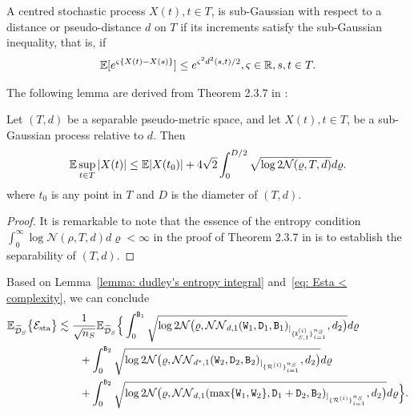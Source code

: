     \begin{definition}
        A centred stochastic process $X(t), t \in T$, is sub-Gaussian with respect to a distance or pseudo-distance $d$ on $T$ if its increments satisfy the sub-Gaussian inequality, that is, if
        \begin{align*}
            \mathbb{E}[e^{\varsigma\{X(t) - X(s)\}}] \leq e^{\varsigma^2d^2(s,t)/2}, \varsigma \in \mathbb{R}, s,t \in T.
        \end{align*}
    \end{definition}

    The following lemma are derived from Theorem 2.3.7 in \citet{gine2016mathematical}:
    \begin{lemma}\label{lemma: dudley's entropy integral}
        Let $(T,d)$ be a separable pseudo-metric space, and let $X(t), t \in T$, be a sub-Gaussian process relative to $d$. Then
        \begin{align*}
            \mathbb{E}\sup_{t \in T}\vert{X(t)}\vert \leq \mathbb{E}\vert{X(t_0)}\vert + 4\sqrt{2}\int_0^{D/2}\sqrt{\log 2\mathcal{N}(\varrho, T, d)}d\varrho.
        \end{align*}
        where $t_0$ is any point in $T$ and $D$ is the diameter of $(T,d)$.
    \end{lemma}
    \begin{proof}
        It is remarkable to note that the essence of the entropy condition $\int_0^\infty \log\mathcal{N}(\rho, T, d)d\varrho < \infty$ in the proof of Theorem 2.3.7 in \citet{gine2016mathematical} is to establish the separability of $(T,d)$.
    \end{proof}
    Based on Lemma~\ref{lemma: dudley's entropy integral} and~\eqref{eq: Esta < complexity}, we can conclude
    \begin{align}\label{eq: Esta < entropy}
        \mathbb{E}_{\widetilde{\mathcal{D}}_S}\big\{\mathcal{E}_{\mathrm{sta}}\big\} &\lesssim \frac{1}{\sqrt{n_S}}\mathbb{E}_{\widetilde{\mathcal{D}}_S}\Big\{\int_0^{\mathtt{B}_1}\sqrt{\log2\mathcal{N}\big(\varrho, \mathcal{NN}_{d,1}(\mathtt{W}_1, \mathtt{D}_1, \mathtt{B}_1)_{\vert_{\{\mathtt{X}^{(i)}_{S,1}\}_{i=1}^{n_S}}}, d_2\big)}d\varrho \nonumber\\
        &\qquad+ \int_0^{\mathtt{B}_2}\sqrt{\log2\mathcal{N}\big(\varrho, \mathcal{NN}_{d^*,1}(\mathtt{W}_2, \mathtt{D}_2, \mathtt{B}_2)_{\vert_{\{\mathcal{R}^{(i)}\}_{i=1}^{n_S}}}, d_2\big)}d\varrho \nonumber\\
        &\qquad+ \int_0^{\mathtt{B}_2}\sqrt{\log2\mathcal{N}\big(\varrho, \mathcal{NN}_{d,1}(\max\{\mathtt{W}_1, \mathtt{W}_2\}, \mathtt{D}_1 + \mathtt{D}_2, \mathtt{B}_2)_{\vert_{\{\mathcal{R}^{(i)}\}_{i=1}^{n_S}}}, d_2\big)}d\varrho
        \Big\}.
    \end{align}

